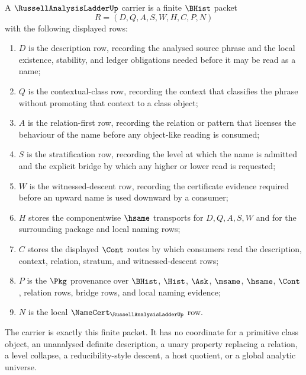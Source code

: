 \begin{definition}
\label{def:russell-analysis-ladder-carrier}
A $\RussellAnalysisLadderUp$ carrier is a finite $\BHist$ packet
$$
R=(D,Q,A,S,W,H,C,P,N)
$$
with the following displayed rows:
\begin{enumerate}
\item $D$ is the description row, recording the analysed source phrase and the local existence, stability, and ledger obligations needed before it may be read as a name;
\item $Q$ is the contextual-class row, recording the context that classifies the phrase without promoting that context to a class object;
\item $A$ is the relation-first row, recording the relation or pattern that licenses the behaviour of the name before any object-like reading is consumed;
\item $S$ is the stratification row, recording the level at which the name is admitted and the explicit bridge by which any higher or lower read is requested;
\item $W$ is the witnessed-descent row, recording the certificate evidence required before an upward name is used downward by a consumer;
\item $H$ stores the componentwise $\hsame$ transports for $D,Q,A,S,W$ and for the surrounding package and local naming rows;
\item $C$ stores the displayed $\Cont$ routes by which consumers read the description, context, relation, stratum, and witnessed-descent rows;
\item $P$ is the $\Pkg$ provenance over $\BHist$, $\Hist$, $\Ask$, $\msame$, $\hsame$, $\Cont$, relation rows, bridge rows, and local naming evidence;
\item $N$ is the local $\NameCert_{\RussellAnalysisLadderUp}$ row.
\end{enumerate}
The carrier is exactly this finite packet. It has no coordinate for a primitive class object, an unanalysed definite description, a unary property replacing a relation, a level collapse, a reducibility-style descent, a host quotient, or a global analytic universe.
\end{definition}

